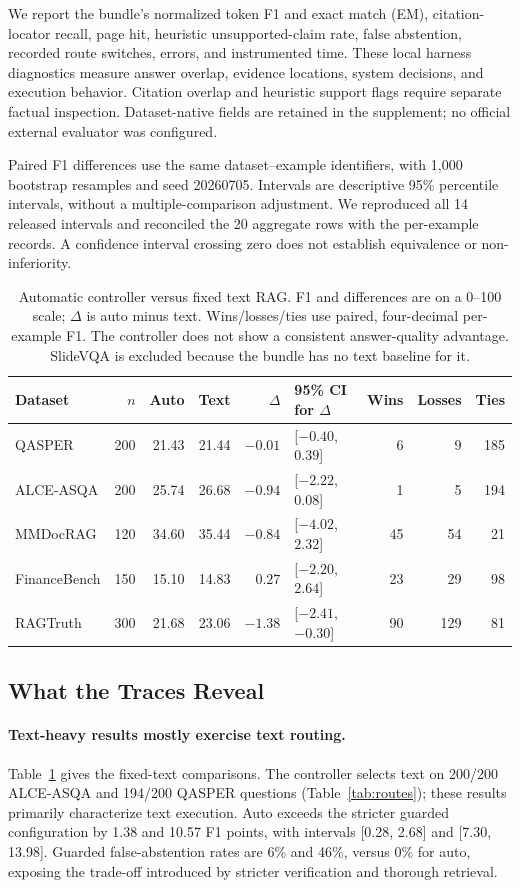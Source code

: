 We report the bundle's normalized token F1 and exact match (EM), citation-locator recall, page hit, heuristic unsupported-claim rate, false abstention, recorded route switches, errors, and instrumented time. These local harness diagnostics measure answer overlap, evidence locations, system decisions, and execution behavior. Citation overlap and heuristic support flags require separate factual inspection. Dataset-native fields are retained in the supplement; no official external evaluator was configured.

Paired F1 differences use the same dataset--example identifiers, with 1,000 bootstrap resamples and seed 20260705. Intervals are descriptive 95\% percentile intervals, without a multiple-comparison adjustment. We reproduced all 14 released intervals and reconciled the 20 aggregate rows with the per-example records. A confidence interval crossing zero does not establish equivalence or non-inferiority.

\begin{table}[t]
\centering
\small
\begin{tabular}{@{}lrrrrlrrr@{}}
\toprule
Dataset & $n$ & Auto & Text & $\Delta$ & 95\% CI for $\Delta$ & Wins & Losses & Ties \\
\midrule
QASPER & 200 & 21.43 & 21.44 & $-0.01$ & [$-0.40$, $0.39$] & 6 & 9 & 185 \\
ALCE-ASQA & 200 & 25.74 & 26.68 & $-0.94$ & [$-2.22$, $0.08$] & 1 & 5 & 194 \\
MMDocRAG & 120 & 34.60 & 35.44 & $-0.84$ & [$-4.02$, $2.32$] & 45 & 54 & 21 \\
FinanceBench & 150 & 15.10 & 14.83 & $0.27$ & [$-2.20$, $2.64$] & 23 & 29 & 98 \\
RAGTruth & 300 & 21.68 & 23.06 & $-1.38$ & [$-2.41$, $-0.30$] & 90 & 129 & 81 \\
\bottomrule
\end{tabular}
\caption{Automatic controller versus fixed text RAG. F1 and differences are on a 0--100 scale; $\Delta$ is auto minus text. Wins/losses/ties use paired, four-decimal per-example F1. The controller does not show a consistent answer-quality advantage. SlideVQA is excluded because the bundle has no text baseline for it.}
\label{tab:paired}
\end{table}

\subsection{What the Traces Reveal}
\paragraph{Text-heavy results mostly exercise text routing.}
Table~\ref{tab:paired} gives the fixed-text comparisons. The controller selects text on 200/200 ALCE-ASQA and 194/200 QASPER questions (Table~\ref{tab:routes}); these results primarily characterize text execution. Auto exceeds the stricter guarded configuration by 1.38 and 10.57 F1 points, with intervals [0.28, 2.68] and [7.30, 13.98]. Guarded false-abstention rates are 6\% and 46\%, versus 0\% for auto, exposing the trade-off introduced by stricter verification and thorough retrieval.

